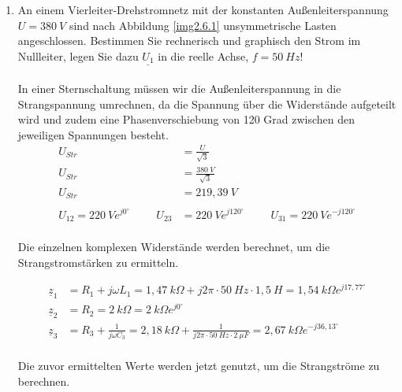 \begin{enumerate}[label=\alph*)]
  \item\label{aufgabe2.5} An einem Vierleiter-Drehstromnetz mit der konstanten Außenleiterspannung $U = 380\ V$ sind nach Abbildung \ref{img2.6.1} unsymmetrische Lasten angeschlossen. Bestimmen Sie rechnerisch und graphisch den Strom im Nullleiter, legen Sie dazu $\underline{U_1}$ in die reelle Achse, $f = 50\ Hz$!
	\\ \ \\
	In einer Sternschaltung müssen wir die Außenleiterspannung in die Strangspannung umrechnen, da die Spannung über die Widerstände aufgeteilt wird und zudem eine Phasenverschiebung von 120 Grad zwischen den jeweiligen Spannungen besteht.\\
	\begin{align*}
		U_{Str} &= \frac{U}{\sqrt{3}} \\
		U_{Str} &= \frac{380\ V}{\sqrt{3}}\\
		U_{Str} &= 219,39\ V\\ \ \\
		U_{12}=220\ Ve^{j0^\circ} \hspace{1cm}
		U_{23}&=220\ Ve^{j120^\circ} \hspace{1cm}
		U_{31}=220\ Ve^{-j120^\circ}\\
	\end{align*}
		
	Die einzelnen komplexen Widerstände werden berechnet, um die Strangstromstärken zu ermitteln.
	
	\begin{align*}
		\underline{z}_{1} &= R_{1} + j\omega L_{1} = 1,47\ k\Omega + j2\pi\cdot 50\ Hz\cdot1,5\ H = 1,54\ k\Omega e^{j17,77^\circ}\\
		\underline{z}_{2} &= R_{2} = 2\ k\Omega = 2\ k\Omega e^{j0^\circ}\\
		\underline{z}_{3} &= R_{3} + \frac{1}{j\omega C_{3}} = 2,18\ k\Omega + \frac{1}{j2\pi\cdot 50\ Hz\cdot2\ \mu F} = 2,67\ k\Omega e^{-j36,13^\circ}\\
	\end{align*}
	
	Die zuvor ermittelten Werte werden jetzt genutzt, um die Strangströme zu berechnen.
	

\end{enumerate}
